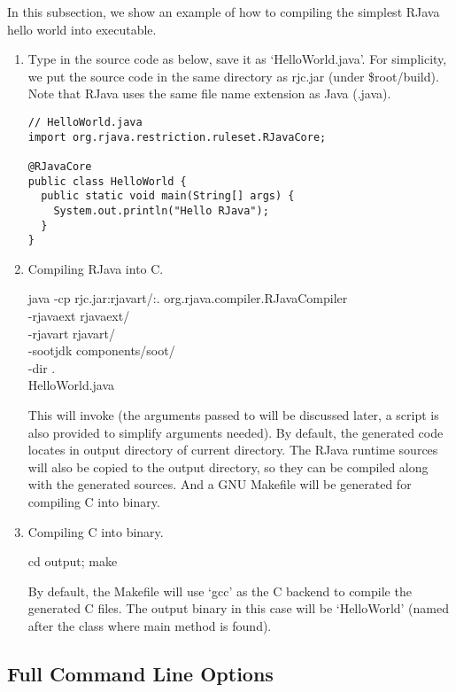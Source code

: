\documentclass[12pt]{article}
\begin{document}
In this subsection, we show an example of how to compiling
the simplest RJava hello world into executable. 

\begin{enumerate}
\item Type in the source code as below, save it as `HelloWorld.java'. 
For simplicity, we put the source code in the same directory as rjc.jar
(under \$root/build). 
Note that RJava uses the same file name extension as Java (.java). 

\begin{lstlisting}
// HelloWorld.java
import org.rjava.restriction.ruleset.RJavaCore;

@RJavaCore
public class HelloWorld {
  public static void main(String[] args) {
    System.out.println("Hello RJava");
  }
}
\end{lstlisting}

\item Compiling RJava into C. 
\begin{cmd}
java -cp rjc.jar:rjava\textunderscore rt/:. org.rjava.compiler.RJavaCompiler \\
-rjava\textunderscore ext rjava\textunderscore ext/ \\
-rjava\textunderscore rt rjava\textunderscore rt/ \\
-soot\textunderscore jdk components/soot/ \\
-dir . \\
HelloWorld.java
\end{cmd}
This will invoke \rjcfull (the arguments passed to \rjc will be discussed later, 
a script is also provided to simplify arguments needed). 
By default, the generated code locates in output directory of current directory. 
The RJava runtime sources will also be copied to the output directory, so they
can be compiled along with the generated sources. And
a GNU Makefile will be generated for compiling C into binary. 

\item Compiling C into binary.
\begin{cmd}
cd output; make
\end{cmd}
By default, the Makefile will use `gcc' as the C backend to compile the generated
C files. The output binary in this case will be `HelloWorld' (named after the class
where main method is found). 

\end{enumerate}

\subsection{Full Command Line Options}
\end{document}
